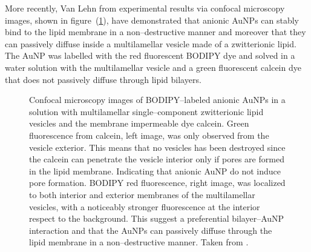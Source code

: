 More recently, Van Lehn \etal \cite{VanLehn2013} from experimental results via confocal microscopy images, shown in figure~(\ref{fig:fluorescent}), have demonstrated that anionic \acp{AuNP} can stably bind to the lipid membrane in a non--destructive manner and moreover that they can passively diffuse inside a multilamellar vesicle made of a zwitterionic lipid. The \ac{AuNP} was labelled with the red fluorescent BODIPY dye and solved in a water solution with the multilamellar vesicle and a green fluorescent calcein dye that does not passively diffuse through lipid bilayers.
\begin{figure}[!ht]
	\centering
	\qquad\qquad\qquad%
	\caption{Confocal microscopy images of BODIPY--labeled anionic \acp{AuNP} in a solution with multilamellar single--component zwitterionic lipid vesicles and the membrane impermeable dye calcein. Green fluorescence from calcein, left image, was only observed from the vesicle exterior. This means that no vesicles has been destroyed since the calcein can penetrate the vesicle interior only if pores are formed in the lipid membrane. Indicating that anionic \acs{AuNP} do not induce pore formation. BODIPY red fluorescence, right image, was localized to both interior and exterior membranes of the multilamellar vesicles, with a noticeably stronger fluorescence at the interior respect to the background. This suggest a preferential bilayer--\acs{AuNP} interaction and that the \acp{AuNP} can passively diffuse through the lipid membrane in a non--destructive manner. Taken from \cite{VanLehn2013}.}%
	\label{fig:fluorescent}
\end{figure}

